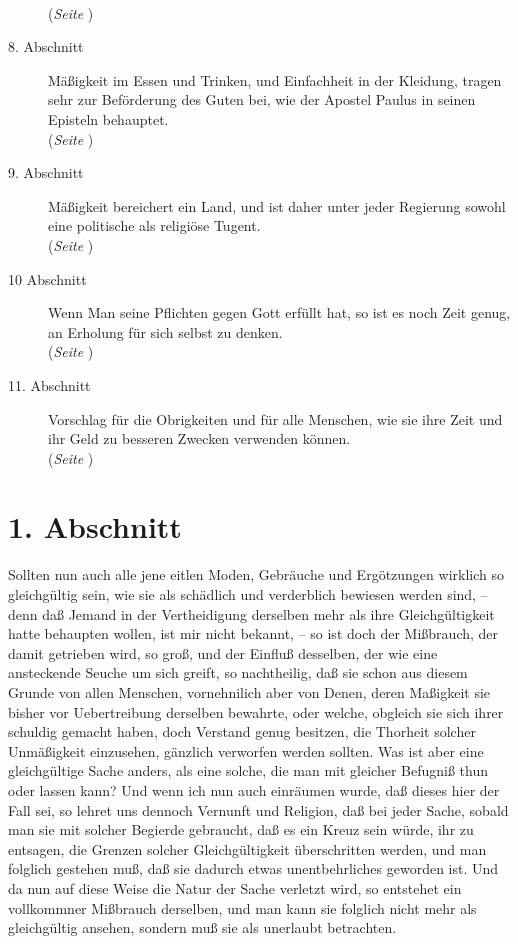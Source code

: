 \begin{description}
\\(\textit{Seite \pageref{kap18_ab7}})
\item[8. Abschnitt] Mäßigkeit im Essen und Trinken, und Einfachheit in der
Kleidung, tragen sehr zur Beförderung des Guten bei, wie der Apostel Paulus in
seinen Episteln behauptet.
\\(\textit{Seite \pageref{kap18_ab8}})
\item[9. Abschnitt] Mäßigkeit bereichert ein Land, und ist daher unter jeder
Regierung sowohl eine politische als religiöse Tugent.
\\(\textit{Seite \pageref{kap18_ab9}})
\item[10 Abschnitt] Wenn Man seine Pflichten gegen Gott erfüllt hat, so ist es
noch Zeit genug, an Erholung für sich selbst zu denken.
\\(\textit{Seite \pageref{kap18_ab10}})
\item[11. Abschnitt] Vorschlag für die Obrigkeiten und für alle Menschen, wie
sie ihre Zeit und ihr Geld zu besseren Zwecken verwenden können.
\\(\textit{Seite \pageref{kap18_ab11}})

\end{description}

\newpage

\section{1. Abschnitt} \label{kap18_ab1}

Sollten nun auch alle jene eitlen Moden, Gebräuche und Ergötzungen wirklich so
gleichgültig sein, wie sie als schädlich und verderblich bewiesen werden sind,
-- denn daß Jemand in der Vertheidigung derselben mehr als ihre Gleichgültigkeit
hatte behaupten wollen, ist mir nicht bekannt, -- so ist doch der Mißbrauch, der
damit getrieben wird, so groß, und der Einfluß desselben, der wie eine
ansteckende Seuche um sich greift, so nachtheilig, daß sie schon aus diesem
Grunde von allen Menschen, vornehnilich aber von Denen, deren Maßigkeit sie
bisher vor Uebertreibung derselben bewahrte, oder welche, obgleich sie sich
ihrer schuldig gemacht haben, doch Verstand genug besitzen, die Thorheit solcher
Unmäßigkeit einzusehen, gänzlich verworfen werden sollten. Was ist aber eine
gleichgültige Sache anders, als eine solche, die man mit gleicher Befugniß thun
oder lassen kann? Und wenn ich nun auch einräumen wurde, daß dieses hier der
Fall sei, so lehret uns dennoch Vernunft und Religion, daß bei jeder Sache,
sobald man sie mit solcher Begierde gebraucht, daß es ein Kreuz
sein würde, ihr
zu entsagen, die Grenzen solcher Gleichgültigkeit überschritten werden, und man
folglich gestehen muß, daß sie dadurch etwas unentbehrliches geworden ist. Und
da nun auf diese Weise die Natur der Sache verletzt wird, so entstehet ein
vollkommner Mißbrauch derselben, und man kann sie folglich nicht mehr als
gleichgültig ansehen, sondern muß sie als unerlaubt betrachten.

